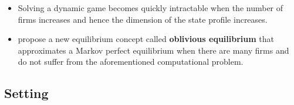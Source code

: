 \documentclass[
]{book}
\providecommand{\tightlist}{%
  \setlength{\itemsep}{0pt}\setlength{\parskip}{0pt}}
\begin{document}
\begin{itemize}
\tightlist
\item
  Solving a dynamic game becomes quickly intractable when the number of firms increases and hence the dimension of the state profile increases.
\item
  \citet{weintraubMarkovPerfectIndustry2008} propose a new equilibrium concept called \textbf{oblivious equilibrium} that approximates a Markov perfect equilibrium when there are many firms and do not suffer from the aforementioned computational problem.
\end{itemize}

\hypertarget{setting-4}{%
\subsection{Setting}\label{setting-4}}
\end{document}
